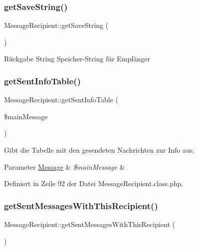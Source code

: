\subsubsection{\texorpdfstring{get\+Save\+String()}{getSaveString()}}
{\footnotesize\ttfamily Message\+Recipient\+::get\+Save\+String (\begin{DoxyParamCaption}{ }\end{DoxyParamCaption})\hspace{0.3cm}{\ttfamily [abstract]}}

\begin{DoxyReturn}{Rückgabe}
String Speicher-\/\+String für Empfänger 
\end{DoxyReturn}
\mbox{\label{class_message_recipient_a02af7aa2d9bedac2cc7911ae886c6eb6}} 
\subsubsection{\texorpdfstring{get\+Sent\+Info\+Table()}{getSentInfoTable()}}
{\footnotesize\ttfamily Message\+Recipient\+::get\+Sent\+Info\+Table (\begin{DoxyParamCaption}\item[{}]{\$main\+Message }\end{DoxyParamCaption})}

Gibt die Tabelle mit den gesendeten Nachrichten zur Info aus. 
\begin{DoxyParams}[1]{Parameter}
\mbox{\hyperlink{class_message}{Message}} & {\em \$main\+Message} & \\
\hline
\end{DoxyParams}


Definiert in Zeile 92 der Datei Message\+Recipient.\+class.\+php.

\mbox{\label{class_message_recipient_a68aea67ca0874a045bdfbcfc5a62ffb1}} 
\subsubsection{\texorpdfstring{get\+Sent\+Messages\+With\+This\+Recipient()}{getSentMessagesWithThisRecipient()}}
{\footnotesize\ttfamily Message\+Recipient\+::get\+Sent\+Messages\+With\+This\+Recipient (\begin{DoxyParamCaption}{ }\end{DoxyParamCaption})}

